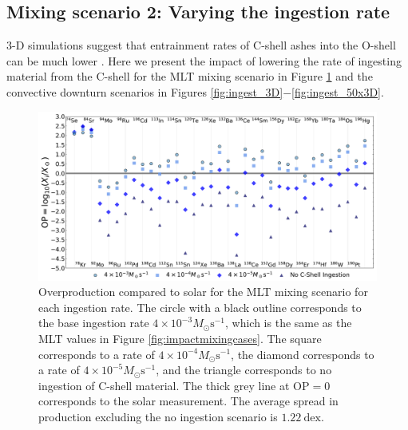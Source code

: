 \subsection{Mixing scenario 2: Varying the ingestion rate}\label{sec:ingestionimpact}

3-D simulations suggest that entrainment rates of C-shell ashes into the O-shell can be much lower \citep{andrassy3DHydrodynamicSimulations2020}.
Here we present the impact of lowering the rate of ingesting material from the C-shell for the MLT mixing scenario in Figure \ref{fig:ingest_MLT} and the convective downturn scenarios in Figures \ref{fig:ingest_3D}$-$\ref{fig:ingest_50x3D}.

\begin{figure}[!htbp]
\includegraphics[width=\textwidth]{chapters/2/figures/ingest_MLT.pdf}
\caption{Overproduction compared to solar for the MLT mixing scenario for each ingestion rate. The circle with a black outline corresponds to the base ingestion rate $4\times10^{-3}M_\odot\mathrm{s^{-1}}$, which is the same as the MLT values in Figure \ref{fig:impactmixingcases}. The square corresponds to a rate of $4\times10^{-4}M_\odot\mathrm{s^{-1}}$, the diamond corresponds to a rate of $4\times10^{-5}M_\odot\mathrm{s^{-1}}$, and the triangle corresponds to no ingestion of C-shell material. The thick grey line at $\mathrm{OP}=0$ corresponds to the solar measurement. The average spread in production excluding the no ingestion scenario is $1.22~\mathrm{dex}$.
\label{fig:ingest_MLT}}
\end{figure}

